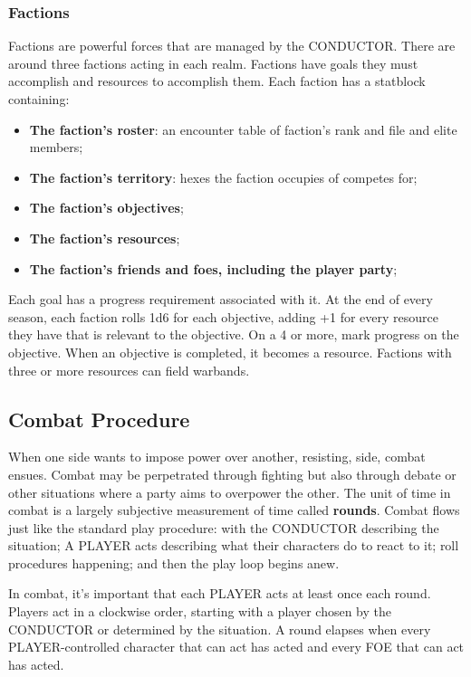 \subsubsection{Factions}
Factions are powerful forces that are managed by the CONDUCTOR. There are around three factions acting in each realm. Factions have goals they must accomplish and resources to accomplish them. Each faction has a statblock containing:
\begin{itemize}
    \item {\textbf{The faction's roster}: an encounter table of faction's rank and file and elite members;}
    \item {\textbf{The faction's territory}: hexes the faction occupies of competes for;}
    \item {\textbf{The faction's objectives};}
    \item {\textbf{The faction's resources};}
    \item {\textbf{The faction's friends and foes, including the player party};}
\end{itemize}
Each goal has a progress requirement associated with it. At the end of every season, each faction rolls 1d6 for each objective, adding +1 for every resource they have that is relevant to the objective. On a 4 or more, mark progress on the objective. When an objective is completed, it becomes a resource. Factions with three or more resources can field warbands.

\subsection{Combat Procedure}
When one side wants to impose power over another, resisting, side, combat ensues. Combat may be perpetrated through fighting but also through debate or other situations where a party aims to overpower the other. The unit of time in combat is a largely subjective measurement of time called \textbf{rounds}. Combat flows just like the standard play procedure: with the CONDUCTOR describing the situation; A PLAYER acts describing what their characters do to react to it; roll procedures happening; and then the play loop begins anew.

In combat, it's important that each PLAYER acts at least once each round. Players act in a clockwise order, starting with a player chosen by the CONDUCTOR or determined by the situation. A round elapses when every PLAYER-controlled character that can act has acted and every FOE that can act has acted.

